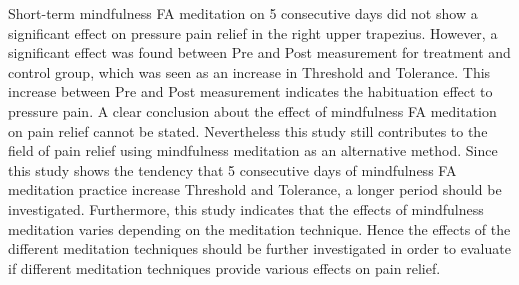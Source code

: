 
Short-term mindfulness FA meditation on 5 consecutive days did not show a significant effect on pressure pain relief in the right upper trapezius. However, a significant effect was found between Pre and Post measurement for treatment and control group, which was seen as an increase in Threshold and Tolerance. This increase between Pre and Post measurement  indicates the habituation effect to pressure pain.
A clear conclusion about the effect of mindfulness FA meditation on pain relief cannot be stated. Nevertheless this study still contributes to the field of pain relief using mindfulness meditation as an alternative method. Since this study shows the tendency that 5 consecutive days of mindfulness FA meditation practice increase Threshold and Tolerance, a longer period should be investigated. Furthermore, this study indicates that the effects of mindfulness meditation varies depending on the meditation technique. Hence the effects of the different meditation techniques should be further investigated in order to evaluate if different meditation techniques provide various effects on pain relief.

